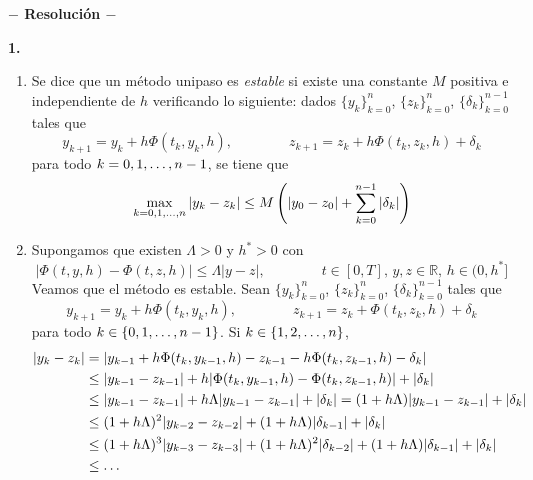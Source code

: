 \documentclass[11pt]{report}
\newcommand{\R}{\mathbb R}
\begin{document}




\begin{center}

	\textbf{$-$ Resolución $-$}

\end{center}


\textbf{1.}

\begin{enumerate} 
    \item Se dice que un método unipaso es \emph{estable} si existe una constante $M$ positiva e independiente de $h$ verificando lo siguiente: dados $\{y_k\}_{k=0}^n$, $\{z_k\}_{k=0}^n$, $\{\delta_k\}_{k=0}^{n-1}$ tales que
    \[y_{k+1} = y_k+h\Phi(t_k,y_k,h), \qquad \qquad z_{k+1}=z_k+h\Phi(t_k,z_k,h)+\delta_k\]
    para todo $k = 0,1,\mathellipsis,n-1$, se tiene que
    \[\max_{k=0,1,\mathellipsis,n} |y_k-z_k| \leq M\left(|y_0-z_0|+\sum_{k=0}^{n-1} |\delta_k|\right)\]
    \item Supongamos que existen $\Lambda >0$ y $h^*>0$ con
    \[|\Phi(t,y,h)-\Phi(t,z,h)| \leq \Lambda |y-z|, \qquad \qquad t \in [0,T], \, y,z \in \R, \, h \in (0,h^*]\]
    Veamos que el método es estable. Sean $\{y_k\}_{k=0}^n$, $\{z_k\}_{k=0}^n$, $\{\delta_k\}_{k=0}^{n-1}$ tales que
    \[y_{k+1} = y_k+h\Phi(t_k,y_k,h), \qquad \qquad z_{k+1}=z_k+\Phi(t_k,z_k,h)+\delta_k\]
    para todo $k \in\{ 0,1,\mathellipsis,n-1\}$. Si $k \in \{1,2,\mathellipsis,n\}$,
    \[\begin{aligned}[t]
        |y_k-z_k| &= |y_{k-1}+h\Phi(t_k,y_{k-1},h) -z_{k-1}-h\Phi(t_k,z_{k-1},h)-\delta_k| \\
        &\leq |y_{k-1}-z_{k-1}|+h|\Phi(t_k,y_{k-1},h)-\Phi(t_k,z_{k-1},h)| + |\delta_k| \\
        &\leq |y_{k-1}-z_{k-1}|+h\Lambda |y_{k-1}-z_{k-1}| + |\delta_k| = (1+h\Lambda) |y_{k-1}-z_{k-1}|+|\delta_k| \\
        &\leq  (1+h\Lambda)^2|y_{k-2}-z_{k-2}|+(1+h\Lambda)|\delta_{k-1}|+|\delta_k| \\
        &\leq  (1+h\Lambda)^3|y_{k-3}-z_{k-3}|+(1+h\Lambda)^2|\delta_{k-2}|+(1+h\Lambda)|\delta_{k-1}|+|\delta_k| \\
        &\leq \mathellipsis \\

\end{aligned}\]
\end{enumerate}
\end{document}
